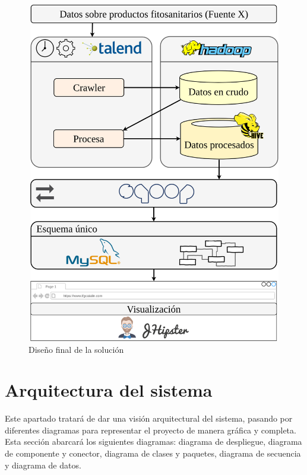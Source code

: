 \begin{figure}[H]
    \centering
    \includegraphics[width=1\textwidth,height=15cm,keepaspectratio]{Imagenes/disenyofinal}
    \caption{Diseño final de la solución}
    \label{fig:disenyofinal}
\end{figure}


\section{Arquitectura del sistema} \label{disenyo.arquitectura}
\par Este apartado tratará de dar una visión arquitectural del sistema, pasando por diferentes diagramas para representar el proyecto de manera gráfica y completa. Esta sección abarcará los siguientes diagramas: diagrama de despliegue, diagrama de componente y conector, diagrama de clases y paquetes, diagrama de secuencia y diagrama de datos. 

